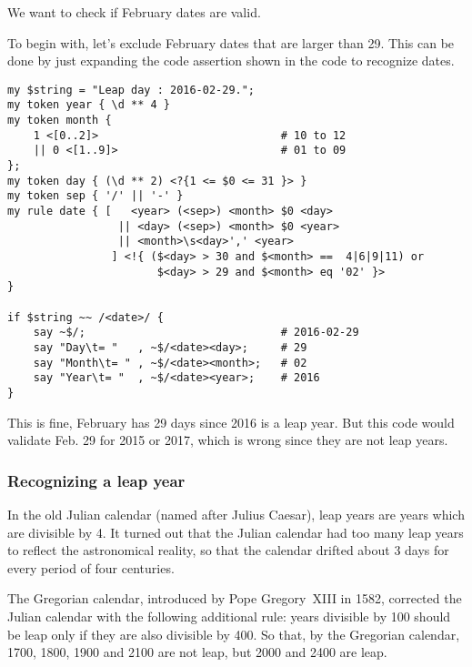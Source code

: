 We want to check if February dates are valid.

To begin with, let's exclude February dates that are 
larger than 29. This can be done by just expanding the 
code assertion shown in the code to recognize dates.

\begin{verbatim}
my $string = "Leap day : 2016-02-29.";                                         
my token year { \d ** 4 }                                        
my token month {   
    1 <[0..2]>                            # 10 to 12                     
    || 0 <[1..9]>                         # 01 to 09                     
};
my token day { (\d ** 2) <?{1 <= $0 <= 31 }> }  
my token sep { '/' || '-' }                                                 
my rule date { [   <year> (<sep>) <month> $0 <day> 
                 || <day> (<sep>) <month> $0 <year> 
                 || <month>\s<day>',' <year>
                ] <!{ ($<day> > 30 and $<month> ==  4|6|9|11) or 
                       $<day> > 29 and $<month> eq '02' }>
}                         

if $string ~~ /<date>/ {
    say ~$/;                              # 2016-02-29
    say "Day\t= "   , ~$/<date><day>;     # 29
    say "Month\t= " , ~$/<date><month>;   # 02
    say "Year\t= "  , ~$/<date><year>;    # 2016
}                    
\end{verbatim}

This is fine, February has 29 days since 2016 is a leap 
year. But this code would validate Feb. 29 for 2015 or 
2017, which is wrong since they are not leap years.

\subsubsection{Recognizing a leap year}

In the old Julian calendar (named after Julius Caesar), 
leap years are years which are divisible by 4. It turned 
out that the Julian calendar had too many leap years 
to reflect the astronomical reality, so that the 
calendar drifted about 3 days for every period of four 
centuries.

The Gregorian calendar, introduced by Pope Gregory~XIII 
in 1582, corrected the Julian calendar with 
the following additional rule: years divisible by 100 should 
be leap only if they are also divisible by 400. So that, by the 
Gregorian calendar, 1700, 1800, 1900 and 2100 are not leap, 
but 2000 and 2400 are leap.

